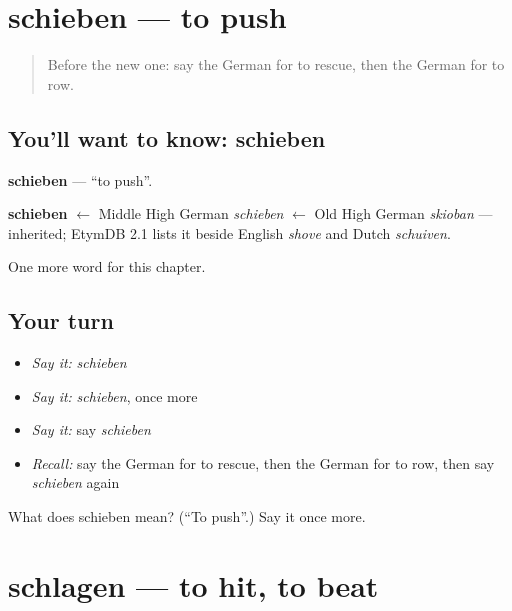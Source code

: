 \section[schieben]{schieben — to push}

\label{lesson:GE-C185-schieben}



\begin{quote}
Before the new one: say the German for to rescue, then the German for to row.
\end{quote}

\subsection*{You'll want to know: schieben}
\textbf{schieben} — \textquotedblleft{}to push\textquotedblright{}.

\begin{cousinweb}
\textbf{schieben} $\leftarrow$ Middle High German \emph{schieben} $\leftarrow$ Old High German \emph{skioban} — inherited; EtymDB 2.1 lists it beside English \emph{shove} and Dutch \emph{schuiven}.
\end{cousinweb}

\begin{grammarlens}[title={What you've built}]
One more word for this chapter.
\end{grammarlens}

\subsection*{Your turn}
\begin{itemize}
\raggedright
  \item \emph{Say it:} \emph{schieben}
  \item \emph{Say it:} \emph{schieben}, once more
  \item \emph{Say it:} say \emph{schieben}
  \item \emph{Recall:} say the German for to rescue, then the German for to row, then say \emph{schieben} again
\end{itemize}

\begin{tcolorbox}[breakable,colback=teal!4,colframe=teal!35!black,title={Before you move on}]
What does schieben mean? (\textquotedblleft{}To push\textquotedblright{}.) Say it once more.
\end{tcolorbox}
\section[schlagen]{schlagen — to hit, to beat}

